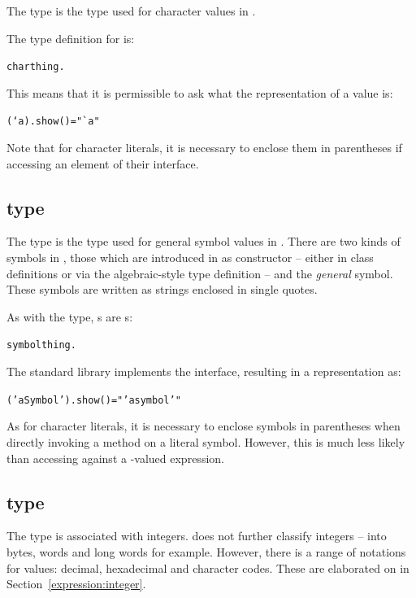 The  type is the type used for character values in \go.

The type definition for  is:
\begin{alltt}
char \impl thing.
\end{alltt}
This means that it is permissible to ask what the  representation of a  value is:
\begin{alltt}
(`a).show() = "`a"
\end{alltt}
\begin{aside}
Note that for character literals, it is necessary to enclose them in parentheses if accessing an element of their interface.
\end{aside}

\subsection{ type}
\label{types:symbol}

The  type is the type used for general symbol values in \go. There are two kinds of symbols in \go, those which are introduced in as constructor -- either in class definitions or via the algebraic-style type definition -- and the \emph{general} symbol. These symbols are written as strings enclosed in single quotes.

As with the  type, s are s:
\begin{alltt}
symbol \impl thing.
\end{alltt}

The standard library implements the  interface, resulting in a  representation as:
\begin{alltt}
('a Symbol').show() = "' a symbol'"
\end{alltt}
\begin{aside}
As for character literals, it is necessary to enclose symbols in parentheses when directly invoking a method on a literal symbol. However, this is much less likely than accessing against a -valued expression.
\end{aside}

\subsection{ type}
\label{types:integer}

The  type is associated with integers. \go does not further classify integers -- into bytes, words and long words for example. However, there is a range of notations for  values: decimal, hexadecimal and character codes. These are elaborated on in Section~\vref{expression:integer}.

